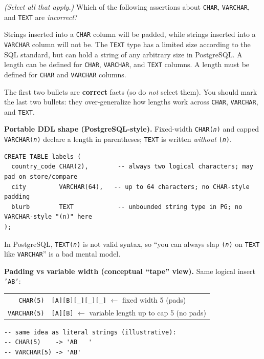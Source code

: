 \question[4]
\textit{(Select all that apply.)} Which of the following assertions about \texttt{CHAR}, \texttt{VARCHAR}, and \texttt{TEXT} are \emph{incorrect}?
\begin{checkboxes}
  \choice Strings inserted into a \texttt{CHAR} column will be padded, while strings inserted into a \texttt{VARCHAR} column will not be.
  \choice The \texttt{TEXT} type has a limited size according to the SQL standard, but can hold a string of any arbitrary size in PostgreSQL.
  \CorrectChoice A length can be defined for \texttt{CHAR}, \texttt{VARCHAR}, and \texttt{TEXT} columns.
  \CorrectChoice A length must be defined for \texttt{CHAR} and \texttt{VARCHAR} columns.
\end{checkboxes}
\begin{solution}
  The first two bullets are \textbf{correct} facts (so do \emph{not} select them). You should mark the last two bullets: they over-generalize how lengths work across \texttt{CHAR}, \texttt{VARCHAR}, and \texttt{TEXT}.

  \medskip\noindent\textbf{Portable DDL shape (PostgreSQL-style).} Fixed-width \texttt{CHAR(\textit{n})} and capped \texttt{VARCHAR(\textit{n})} declare a length in parentheses; \texttt{TEXT} is written \emph{without} \texttt{(\textit{n})}.
\begin{lstlisting}[style=sql]
CREATE TABLE labels (
  country_code CHAR(2),        -- always two logical characters; may pad on store/compare
  city         VARCHAR(64),   -- up to 64 characters; no CHAR-style padding
  blurb        TEXT            -- unbounded string type in PG; no VARCHAR-style "(n)" here
);
\end{lstlisting}
  In PostgreSQL, \texttt{TEXT(\textit{n})} is not valid syntax, so ``you can always slap \texttt{(\textit{n})} on \texttt{TEXT} like \texttt{VARCHAR}'' is a bad mental model.

  \medskip\noindent\textbf{Padding vs variable width (conceptual ``tape'' view).} Same logical insert \texttt{'AB'}:
\begin{center}
{\ttfamily\small
\begin{tabular}{@{}r@{ }l@{}}
  \texttt{CHAR(5)}     & \texttt{[A][B][\_][\_][\_]} \quad $\leftarrow$ fixed width 5 (pads) \\
  \texttt{VARCHAR(5)}  & \texttt{[A][B]} \quad $\leftarrow$ variable length up to cap 5 (no pads) \\
\end{tabular}\par}
\end{center}
\begin{lstlisting}[style=sql]
-- same idea as literal strings (illustrative):
-- CHAR(5)    -> 'AB   '
-- VARCHAR(5) -> 'AB'
\end{lstlisting}


\end{solution}
